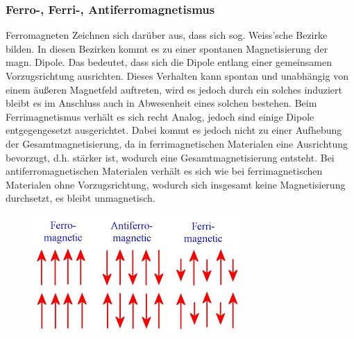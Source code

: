         \subsubsection*{Ferro-, Ferri-, Antiferromagnetismus}
            Ferromagneten Zeichnen sich darüber aus, dass sich sog. Weiss'sche Bezirke bilden. In diesen Bezirken
            kommt es zu einer spontanen Magnetisierung der magn. Dipole. Das bedeutet, dass sich die Dipole entlang einer
            gemeinsamen Vorzugsrichtung ausrichten. Dieses Verhalten kann spontan und unabhängig von einem äußeren Magnetfeld
            auftreten, wird es jedoch durch ein solches induziert bleibt es im Anschluss auch in Abwesenheit eines solchen bestehen.
            Beim Ferrimagnetismus verhält es sich recht Analog, jedoch sind einige Dipole entgegengesetzt ausgerichtet.
            Dabei kommt es jedoch nicht zu einer Aufhebung der Gesamtmagnetisierung, da in ferrimagnetischen Materialen
            eine Ausrichtung bevorzugt, d.h. stärker ist, wodurch eine Gesamtmagnetisierung entsteht.
            Bei antiferromagnetischen Materialen verhält es sich wie bei ferrimagnetischen Materialen ohne Vorzugsrichtung,
            wodurch sich insgesamt keine Magnetisierung durchsetzt, es bleibt unmagnetisch.
            \begin{figure}[H]
                \centering
                \includegraphics{Images/ferroferrianti.png}
            \end{figure}
